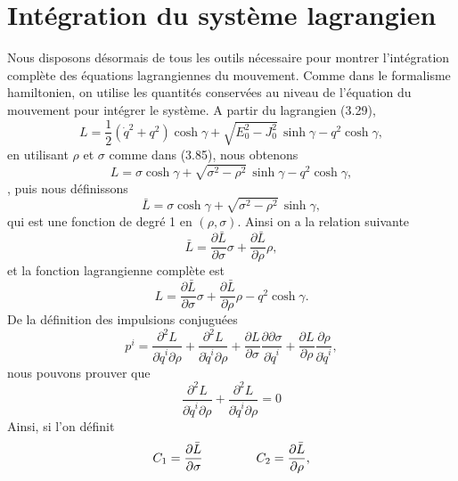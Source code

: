 \documentclass[12pt,a4paper, openany]{report}
\begin{document}
	\section{Intégration du système lagrangien}
	Nous disposons désormais de tous les outils nécessaire pour montrer l'intégration complète des équations lagrangiennes du mouvement. Comme dans le formalisme hamiltonien, on utilise les quantités conservées au niveau de l'équation du mouvement pour intégrer le système. A partir du lagrangien (3.29),
	\begin{equation*}  
		L=\frac{1}{2}\left(\dot{q}^{2}+q^{2}\right)\cosh{\gamma}+\sqrt{E^2_0-J_0^2}\,\sinh{\gamma}-q^{2}\cosh{\gamma},
	\end{equation*} en utilisant $\rho$ et $\sigma$ comme dans (3.85), nous obtenons
	\begin{equation}  
		L=\sigma\cosh{\gamma}+\sqrt{\sigma^2-\rho^2}\,\sinh{\gamma}-q^{2}\cosh{\gamma},\end{equation},
	puis nous définissons 
	\begin{equation}  
		\bar{L}=\sigma\cosh{\gamma}+\sqrt{\sigma^2-\rho^2}\,\sinh{\gamma},
	\end{equation} qui est une fonction de degré 1 en $\left(\rho,\sigma\right)$. Ainsi on a la relation suivante 
	\begin{equation}
		\bar{L}=\frac{\partial{\bar{L}}}{\partial{\sigma}}\sigma+\frac{\partial{\bar{L}}}{\partial{\rho}}\rho ,	
	\end{equation}
	et la fonction lagrangienne complète est 
	\begin{equation}
		L=\frac{\partial{\bar{L}}}{\partial{\sigma}}\sigma+\frac{\partial{\bar{L}}}{\partial{\rho}}\rho-q^{2}\cosh{\gamma} .	
	\end{equation}
	De la définition des impulsions conjuguées 
	\begin{equation}
		p^i=\frac{\partial^{2}L}{\partial \dot{q}^i\partial\rho}+\frac{\partial^{2}L}{\partial \dot{q}^i\partial\rho}+\frac{\partial L}{\partial \sigma}\frac{\partial \partial \sigma}{\partial \dot{q}^i}+\frac{\partial L}{\partial \rho}\frac{\partial \rho}{\partial \dot{q}^i} ,
	\end{equation}
	nous pouvons prouver que
	\begin{equation}
		\frac{\partial^{2}L}{\partial \dot{q}^i\partial\rho}+\frac{\partial^{2}L}{\partial \dot{q}^i\partial\rho}=0
	\end{equation} Ainsi, si l'on définit 
	\begin{equation}
		C_1=\frac{\partial\bar{L} }{\partial \sigma} \hspace{1.5cm}C_2=\frac{\partial \bar{L}}{\partial \rho},
	\end{equation}
\end{document}
